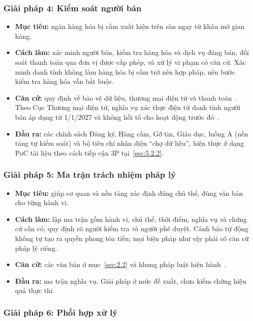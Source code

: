 \subsubsection{Giải pháp 4: Kiểm soát người bán}\label{sec:5.1.4}

\begin{itemize}
\item \textbf{Mục tiêu:} ngăn hàng hóa bị cấm xuất hiện trên sàn ngay từ khâu mở gian hàng.
\item \textbf{Cách làm:} xác minh người bán, kiểm tra hàng hóa và dịch vụ đăng bán, đối soát thanh toán qua đơn vị được cấp phép, và xử lý vi phạm có căn cứ. Xác minh danh tính không làm hàng hóa bị cấm trở nên hợp pháp, nên bước kiểm tra hàng hóa vẫn bắt buộc.
\item \textbf{Căn cứ:} quy định về bảo vệ dữ liệu, thương mại điện tử và thanh toán~\cite{luat-bvdlcn-2025,nd356-2025,vbhn-tmdt-2020,nd52-2024,luat-tmdt-2025}. Theo Cục Thương mại điện tử, nghĩa vụ xác thực điện tử danh tính người bán áp dụng từ 1/1/2027 và không hồi tố cho hoạt động trước đó~\cite{cuc-tmdt-2026}.
\item \textbf{Đầu ra:} các chính sách Đăng ký, Hàng cấm, Gỡ tin, Giáo dục, luồng A (nền tảng tự kiểm soát) và bộ tiêu chí nhận diện “chợ dữ liệu”, hiện thực ở dạng PoC tài liệu theo cách tiếp cận 3P tại~\ref{sec:5.2.2}.
\end{itemize}
\subsubsection{Giải pháp 5: Ma trận trách nhiệm pháp lý}\label{sec:5.1.5}

\begin{itemize}
\item \textbf{Mục tiêu:} giúp cơ quan và nền tảng xác định đúng chủ thể, đúng văn bản cho từng hành vi.
\item \textbf{Cách làm:} lập ma trận gồm hành vi, chủ thể, thời điểm, nghĩa vụ và chứng cứ cần có; quy định rõ người kiểm tra và người phê duyệt. Cảnh báo tự động không tự tạo ra quyền phong tỏa tiền; mọi biện pháp như vậy phải có căn cứ pháp lý riêng.
\item \textbf{Căn cứ:} các văn bản ở mục~\ref{sec:2.2} và khung pháp luật hiện hành~\cite{luat-bvdlcn-2025,nd356-2025,luat-anm-2025,luat-tmdt-2025}.
\item \textbf{Đầu ra:} ma trận nghĩa vụ. Giải pháp ở mức đề xuất, chưa kiểm chứng hiệu quả thực thi.
\end{itemize}
\subsubsection{Giải pháp 6: Phối hợp xử lý}\label{sec:5.1.6}

